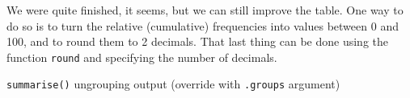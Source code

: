 \documentclass[]{tufte-book}
\newenvironment{Shaded}{}{}
\newcommand{\DataTypeTok}[1]{\textcolor[rgb]{0.56,0.13,0.00}{#1}}
\newcommand{\DecValTok}[1]{\textcolor[rgb]{0.25,0.63,0.44}{#1}}
\newcommand{\KeywordTok}[1]{\textcolor[rgb]{0.00,0.44,0.13}{\textbf{#1}}}
\newcommand{\NormalTok}[1]{#1}
\newcommand{\OperatorTok}[1]{\textcolor[rgb]{0.40,0.40,0.40}{#1}}
\newcommand{\StringTok}[1]{\textcolor[rgb]{0.25,0.44,0.63}{#1}}
\begin{document}
We were quite finished, it seems, but we can still improve the table. One way to do so is to turn the relative (cumulative) frequencies into values between 0 and 100, and to round them to 2 decimals. That last thing can be done using the function \texttt{round} and specifying the number of decimals.

\begin{Shaded}
\end{Shaded}

\texttt{summarise()} ungrouping output (override with \texttt{.groups} argument)
\end{document}
